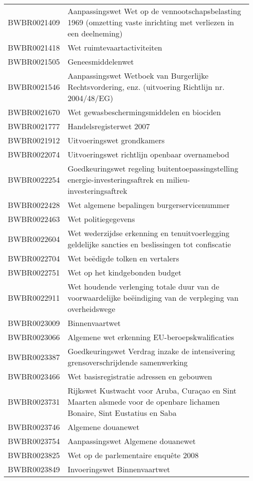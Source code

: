 \begin{longtable}{lp{}}
BWBR0021409 & Aanpassingswet Wet op de vennootschapsbelasting 1969 (omzetting vaste inrichting met verliezen in een deelneming) \\
BWBR0021418 & Wet ruimtevaartactiviteiten \\
BWBR0021505 & Geneesmiddelenwet \\
BWBR0021546 & Aanpassingswet Wetboek van Burgerlijke Rechtsvordering, enz. (uitvoering Richtlijn nr. 2004/48/EG) \\
BWBR0021670 & Wet gewasbeschermingsmiddelen en biociden \\
BWBR0021777 & Handelsregisterwet 2007 \\
BWBR0021912 & Uitvoeringswet grondkamers \\
BWBR0022074 & Uitvoeringswet richtlijn openbaar overnamebod \\
BWBR0022254 & Goedkeuringswet regeling buitentoepassingstelling energie-investeringsaftrek en milieu-investeringsaftrek \\
BWBR0022428 & Wet algemene bepalingen burgerservicenummer \\
BWBR0022463 & Wet politiegegevens \\
BWBR0022604 & Wet wederzijdse erkenning en tenuitvoerlegging geldelijke sancties en beslissingen tot confiscatie \\
BWBR0022704 & Wet beëdigde tolken en vertalers \\
BWBR0022751 & Wet op het kindgebonden budget \\
BWBR0022911 & Wet houdende verlenging totale duur van de voorwaardelijke beëindiging van de verpleging van overheidswege \\
BWBR0023009 & Binnenvaartwet \\
BWBR0023066 & Algemene wet erkenning EU-beroepskwalificaties \\
BWBR0023387 & Goedkeuringswet Verdrag inzake de intensivering grensoverschrijdende samenwerking \\
BWBR0023466 & Wet basisregistratie adressen en gebouwen  \\
BWBR0023731 & Rijkswet Kustwacht voor Aruba, Curaçao en Sint Maarten alsmede voor de openbare lichamen Bonaire, Sint Eustatius en Saba \\
BWBR0023746 & Algemene douanewet \\
BWBR0023754 & Aanpassingswet Algemene douanewet \\
BWBR0023825 & Wet op de parlementaire enquête 2008 \\
BWBR0023849 & Invoeringswet Binnenvaartwet \\

\end{longtable}
